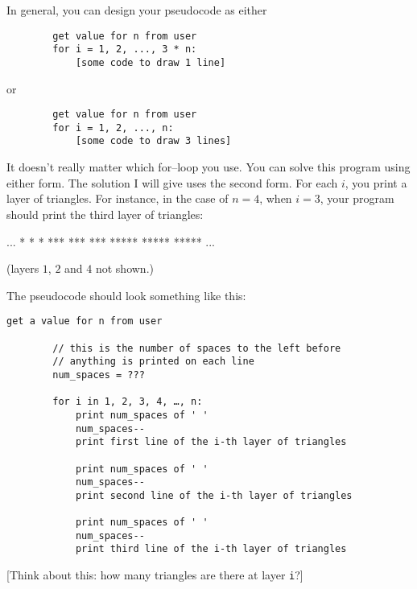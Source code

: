 In general, you can design your pseudocode as either
\begin{verbatim}
        get value for n from user
        for i = 1, 2, ..., 3 * n:
            [some code to draw 1 line]
\end{verbatim}
or
\begin{verbatim}
        get value for n from user
        for i = 1, 2, ..., n:
            [some code to draw 3 lines]
\end{verbatim}

It doesn't really matter which for--loop you use. You can solve this program
using either form. The solution I will give uses the second form. For each $i$,
you print a layer of triangles. For instance, in the case of $n = 4$, when
$i = 3$, your program should print the third layer of triangles:
\begin{console}
...
     *     *     *
    ***   ***   ***
   ***** ***** *****
...
\end{console}
(layers $1$, $2$ and $4$ not shown.) 

The pseudocode should look something like this:

\begin{Verbatim}[commandchars=\\\{\}]
        get a value for n from user

        // this is the number of spaces to the left before
        // anything is printed on each line
        num_spaces = ???

        for i in 1, 2, 3, 4, …, n:
            print num_spaces of ' '
            num_spaces--
            print first line of the i-th layer of triangles

            print num_spaces of ' '
            num_spaces--
            print second line of the i-th layer of triangles

            print num_spaces of ' '
            num_spaces--
            print third line of the i-th layer of triangles
\end{Verbatim}
		
[Think about this: how many triangles are there at layer \verb!i!?]

